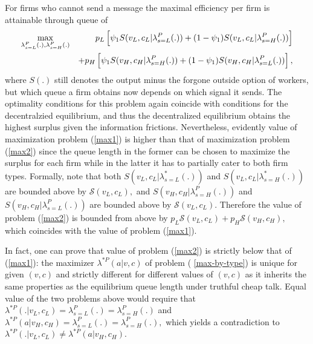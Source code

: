 \documentclass[12pt]{article}
\begin{document}
For firms who cannot send a message the maximal efficiency per firm is
attainable through queue of 
\begin{eqnarray}
\max_{\lambda _{s=L}^{P}(.),\lambda _{s=H}^{P}(.)} &&p_{L}\left[ \psi
_{1}S(v_{L},c_{L}|\lambda _{s=L}^{P}(.))+(1-\psi _{1})S(v_{L},c_{L}|\lambda
_{s=H}^{P}(.))\right]  \label{max2} \\
&&+p_{H}\left[ \psi _{1}S(v_{H},c_{H}|\lambda _{s=H}^{P}(.))+(1-\psi
_{1})S(v_{H},c_{H}|\lambda _{s=L}^{P}(.))\right] ,  \notag
\end{eqnarray}%
where $S(.)$ still denotes the output minus the forgone outside option of
workers, but which queue a firm obtains now depends on which signal it
sends. The optimality conditions for this problem again coincide with
conditions for the decentralzied equilibrium, and thus the decentralized
equilibrium obtains the highest surplus given the information frictions.
Nevertheless, evidently value of maximization problem (\ref{max1}) is higher
than that of maximization problem (\ref{max2}) since the queue length in the
former can be chosen to maximize the surplus for each firm while in the
latter it has to partially cater to both firm types. Formally, note that
both $S(v_{L},c_{L}|\lambda _{s=L}^{\ast }(.))$ and $S(v_{L},c_{L}|\lambda
_{s=H}^{\ast }(.))$ are bounded above by $\mathcal{S}(v_{L},c_{L}),$ and $%
S(v_{H},c_{H}|\lambda _{s=H}^{P}(.))$ and $S(v_{H},c_{H}|\lambda
_{s=L}^{P}(.))$ are bounded above by $\mathcal{S}(v_{L},c_{L}).$ Therefore
the value of problem (\ref{max2}) is bounded from above by $p_{L}%
\mathcal{S}(v_{L},c_{L})+p_{H}\mathcal{S}(v_{H},c_{H}),$ which
coincides with the value of problem (\ref{max1}).

In fact, one can prove that value of problem (\ref{max2}) is strictly below
that of (\ref{max1}): the maximizer $\lambda ^{\ast P}(a|v,c)$ of problem (%
\ref{max-by-type}) is unique for given $(v,c)$ and strictly different for
different values of $(v,c)$ as it inherits the same properties as the
equilibrium queue length under truthful cheap talk. Equal value of the two
problems above would require that $\lambda ^{\ast
P}(.|v_{L},c_{L})=\lambda _{s=L}^{P}(.)=\lambda _{s=H}^{P}(.)$ and $%
\lambda ^{\ast P}(a|v_{H},c_{H})=\lambda _{s=L}^{P}(.)=\lambda
_{s=H}^{P}(.), $ which yields a contradiction to $\lambda ^{\ast
P}(.|v_{L},c_{L})\neq \lambda ^{\ast P}(a|v_{H},c_{H}).$
\end{document}
